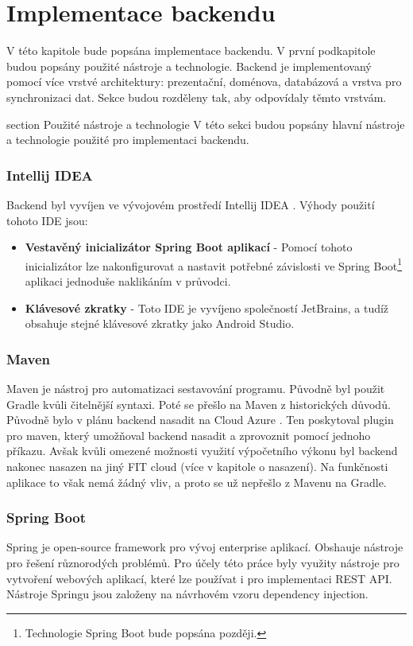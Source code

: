 \chapter{Implementace backendu}
V této kapitole bude popsána implementace backendu. V první podkapitole budou popsány použité nástroje a technologie. Backend je implementovaný pomocí více vrstvé architektury: prezentační, doménova, databázová a vrstva pro synchronizaci dat. Sekce budou rozděleny tak, aby odpovídaly těmto vrstvám.

section {Použité nástroje a technologie}
V této sekci budou popsány hlavní nástroje a technologie použité pro implementaci backendu.

\subsection*{Intellij IDEA}
Backend byl vyvíjen ve vývojovém prostředí Intellij IDEA \cite{idea}. Výhody použití tohoto IDE jsou:
	
\begin{itemize}
	\item \textbf{Vestavěný inicializátor Spring Boot aplikací} - Pomocí tohoto inicializátor lze nakonfigurovat a nastavit potřebné závislosti ve Spring Boot\footnote{Technologie Spring Boot bude popsána později.} aplikaci jednoduše naklikáním v průvodci.
	
	\item \textbf{Klávesové zkratky} - Toto IDE je vyvíjeno společností JetBrains, a tudíž obsahuje stejné klávesové zkratky jako Android Studio.
\end{itemize}

\subsection*{Maven}
Maven je nástroj pro automatizaci sestavování programu. Původně byl použit Gradle kvůli čitelnější syntaxi. Poté se přešlo na Maven z historických důvodů. Původně bylo v plánu backend nasadit na Cloud Azure \cite{azure}. Ten poskytoval plugin pro maven, který umožňoval backend nasadit a zprovoznit pomocí jednoho příkazu. Avšak kvůli omezené možnosti využití výpočetního výkonu byl backend nakonec nasazen na jiný FIT cloud (více v kapitole o nasazení). Na funkčnosti aplikace to však nemá žádný vliv, a proto se už nepřešlo z Mavenu na Gradle. 

\subsection*{Spring Boot}
Spring je open-source framework pro vývoj enterprise aplikací. Obshauje nástroje pro řešení různorodých problémů. Pro účely této práce byly využity nástroje pro vytvoření webových aplikací, které lze používat i pro implementaci REST API. Nástroje Springu jsou založeny na návrhovém vzoru dependency injection.

